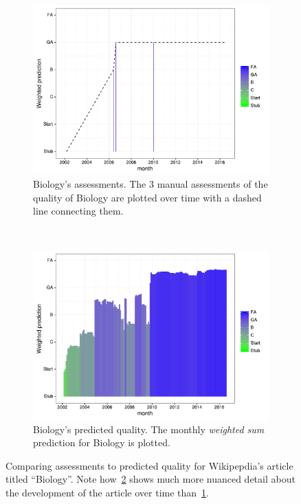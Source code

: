 \begin{figure}[p]
\centering
\begin{subfigure}[t]{.95\columnwidth}
  \centering
  \includegraphics[width=.90\columnwidth]{figures/biology_monthly_assessments}
  \caption{Biology's assessments.  The 3 manual assessments of the quality of Biology are plotted over time with a dashed line connecting them.}
  \label{fig:empirical_biology}
\end{subfigure}~~
\begin{subfigure}[t]{.95\columnwidth}
  \centering
  \includegraphics[width=.90\columnwidth]{figures/biology_monthly_wp10}
  \caption{Biology's predicted quality.  The monthly \emph{weighted sum} prediction for Biology is plotted.}
  \label{fig:predicted_biology}
\end{subfigure}
\caption{Comparing assessments to predicted quality for Wikipepdia's article titled ``Biology''.  Note how~\ref{fig:predicted_biology} shows much more nuanced detail about the development of the article over time than~\ref{fig:empirical_biology}.}
\label{fig:empirical_and_predicted_biology}
\end{figure}
